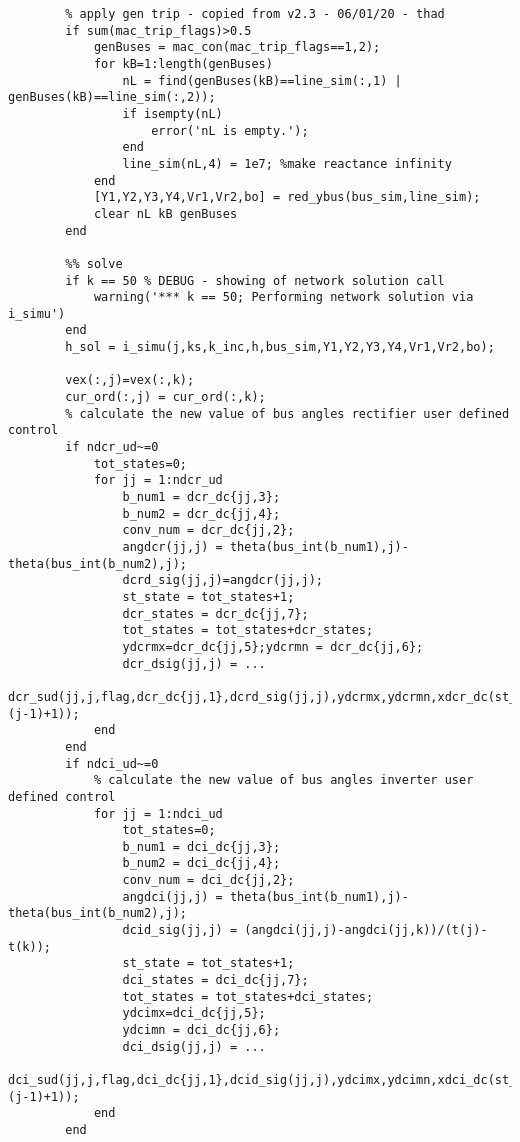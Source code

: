 \documentclass[12pt]{article}
\begin{document}
\begin{verbatim}
        % apply gen trip - copied from v2.3 - 06/01/20 - thad
        if sum(mac_trip_flags)>0.5
            genBuses = mac_con(mac_trip_flags==1,2);
            for kB=1:length(genBuses)
                nL = find(genBuses(kB)==line_sim(:,1) | genBuses(kB)==line_sim(:,2));
                if isempty(nL)
                    error('nL is empty.'); 
                end
                line_sim(nL,4) = 1e7; %make reactance infinity
            end
            [Y1,Y2,Y3,Y4,Vr1,Vr2,bo] = red_ybus(bus_sim,line_sim);
            clear nL kB genBuses
        end
        
        %% solve
        if k == 50 % DEBUG - showing of network solution call
            warning('*** k == 50; Performing network solution via i_simu')
        end
        h_sol = i_simu(j,ks,k_inc,h,bus_sim,Y1,Y2,Y3,Y4,Vr1,Vr2,bo);
        
        vex(:,j)=vex(:,k);
        cur_ord(:,j) = cur_ord(:,k);
        % calculate the new value of bus angles rectifier user defined control
        if ndcr_ud~=0
            tot_states=0;
            for jj = 1:ndcr_ud
                b_num1 = dcr_dc{jj,3};
                b_num2 = dcr_dc{jj,4};
                conv_num = dcr_dc{jj,2};
                angdcr(jj,j) = theta(bus_int(b_num1),j)-theta(bus_int(b_num2),j);
                dcrd_sig(jj,j)=angdcr(jj,j);
                st_state = tot_states+1; 
                dcr_states = dcr_dc{jj,7}; 
                tot_states = tot_states+dcr_states;
                ydcrmx=dcr_dc{jj,5};ydcrmn = dcr_dc{jj,6};
                dcr_dsig(jj,j) = ...
                    dcr_sud(jj,j,flag,dcr_dc{jj,1},dcrd_sig(jj,j),ydcrmx,ydcrmn,xdcr_dc(st_state:tot_states,10*(j-1)+1));
            end
        end
        if ndci_ud~=0
            % calculate the new value of bus angles inverter user defined control
            for jj = 1:ndci_ud
                tot_states=0;
                b_num1 = dci_dc{jj,3};
                b_num2 = dci_dc{jj,4};
                conv_num = dci_dc{jj,2};
                angdci(jj,j) = theta(bus_int(b_num1),j)-theta(bus_int(b_num2),j);
                dcid_sig(jj,j) = (angdci(jj,j)-angdci(jj,k))/(t(j)-t(k));
                st_state = tot_states+1; 
                dci_states = dci_dc{jj,7}; 
                tot_states = tot_states+dci_states;
                ydcimx=dci_dc{jj,5};
                ydcimn = dci_dc{jj,6};
                dci_dsig(jj,j) = ...
                    dci_sud(jj,j,flag,dci_dc{jj,1},dcid_sig(jj,j),ydcimx,ydcimn,xdci_dc(st_state:tot_states,10*(j-1)+1));
            end
        end
        

\end{verbatim}
\end{document}
